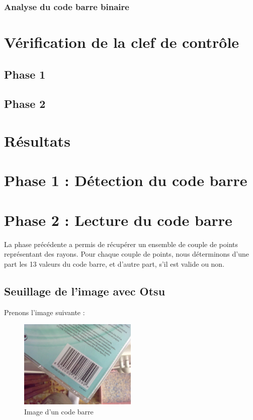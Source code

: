 \documentclass{rapport}
\begin{document}
\subsubsection*{Analyse du code barre binaire}

\section{Vérification de la clef de contrôle}

\subsection{Phase 1}
\subsection{Phase 2}

\section{Résultats}

\section {Phase 1 : Détection du code barre}

\section{Phase 2 : Lecture du code barre}

La phase précédente a permis de récupérer un ensemble de couple de points représentant des rayons. 
Pour chaque couple de points, nous déterminons d'une part les 13 valeurs du code barre, et d'autre part, s'il est valide ou non.

\subsection{Seuillage de l'image avec Otsu}

Prenons l'image suivante :
\begin{figure}[H] %
	\centering
	\includegraphics[width=0.5\textwidth]{images/barcode0.jpg}
	\caption{Image d'un code barre}
	\label{code_barre}
\end{figure}
\end{document}

